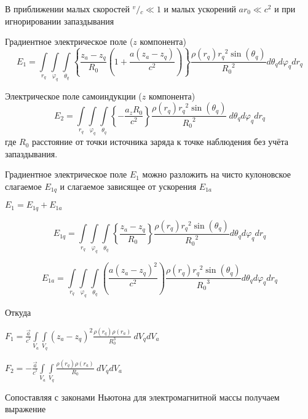 \documentclass[11pt]{article}
\begin{document}
В приближении малых скоростей \({}^{v}/{}_{c}\ll 1\) и малых ускорений
\(a{{r}_{0}}\ll {{c}^{2}}\) и при игнорировании запаздывания

Градиентное электрическое поле (\(z\) компонента) \[{E}_{1}=
\int\limits_{{{r}_{q}}}\int\limits_{{{\varphi}_{q}}}\int\limits_{{{\theta}_{q}}}
\left\{ \frac{z_a-z_q}{{{R}_{0}}}\left( 1+\frac{a\left( {{z}_{a}}-{{z}_{q}} \right)}{c^2} \right)
 \right\}
\frac{\rho \left( {{r}_{q}} \right){{r}_{q}}^{2}\sin \left( {{\theta }_{q}} \right)}{{{R}_{0}}^{2}}
d{{\theta }_{q}}d{{\varphi }_{q}}d{{r}_{q}}\]

Электрическое поле самоиндукции (\(z\) компонента) \[{E}_{2}=
\int\limits_{{{r}_{q}}}\int\limits_{{{\varphi}_{q}}}\int\limits_{{{\theta}_{q}}}
{\left\{ -\frac{{a_z}R_{0}}{{{c}^{2}}} \right\}
\frac{\rho \left( {{r}_{q}} \right){{r}_{q}}^{2}\sin \left( {{\theta }_{q}} \right)}{{{R}_{0}}^{2}}\ }d{{\theta }_{q}}d{{\varphi }_{q}}d{{r}_{q}}\]
где \({R}_{0}\) расстояние от точки источника заряда к точке наблюдения
без учёта запаздывания.

    Градиентное электрическое поле \({E}_{1}\) можно разложить на чисто
кулоновское слагаемое \({E}_{1q}\) и слагаемое зависящее от ускорения
\({E}_{1a}\)

\({E}_{1} = {E}_{1q} + {E}_{1a}\)

\[{E}_{1q}=
\int\limits_{{{r}_{q}}}\int\limits_{{{\varphi}_{q}}}\int\limits_{{{\theta}_{q}}}
\left\{ \frac{z_a-z_q}{{{R}_{0}}}
 \right\}
\frac{\rho \left( {{r}_{q}} \right){{r}_{q}}^{2}\sin \left( {{\theta }_{q}} \right)}{{{R}_{0}}^{2}}
d{{\theta }_{q}}d{{\varphi }_{q}}d{{r}_{q}}\]

\[{E}_{1a}=
\int\limits_{{{r}_{q}}}\int\limits_{{{\varphi}_{q}}}\int\limits_{{{\theta}_{q}}}
\left( \frac{a\left( {{z}_{a}}-{{z}_{q}} \right)^2}{c^2} \right)
\frac{\rho \left( {{r}_{q}} \right){{r}_{q}}^{2}\sin \left( {{\theta }_{q}} \right)}{{{R}_{0}}^{3}}
d{{\theta }_{q}}d{{\varphi }_{q}}d{{r}_{q}}\]

Откуда

\({{F}_{1}}=\frac{\overrightarrow{a}}{{{c}^{^{2}}}}\int\limits_{{{V}_{a}}}{\int\limits_{{{V}_{q}}}{\left( {{z}_{a}}-{{z}_{q}} \right)^2\frac{\rho \left( {{r}_{q}} \right)\rho \left( {{r}_{a}} \right)}{R_{0}^3}}}\ d{{V}_{q}}d{{V}_{a}}\)

\({{F}_{2}}=-\frac{\overrightarrow{a}}{{{c}^{^{2}}}}\int\limits_{{{V}_{a}}}{\int\limits_{{{V}_{q}}}{\frac{\rho \left( {{r}_{q}} \right)\rho \left( {{r}_{a}} \right)}{R_{0}}}}\ d{{V}_{q}}d{{V}_{a}}\)

    Сопоставляя с законами Ньютона для электромагнитной массы получаем
выражение
\end{document}
